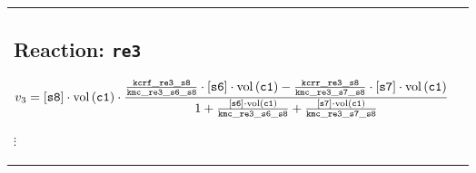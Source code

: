 \documentclass[12pt]{article}
\begin{document}
\begin{center}
\begin{tabular}{lc}
{\begin{minipage}[c]{18.9cm}
\subsection{Reaction: \texttt{re3}}

\begin{equation}
v_{3}=[\mathtt{s8}]\cdot \mathrm{vol}\left(\mathtt{c1}\right)\cdot
\frac{\frac{\mathtt{kcrf\-\_re3\-\_s8}}{\mathtt{kmc\-\_re3\-\_s6\-\_s8}}\cdot
[\mathtt{s6}]\cdot
\mathrm{vol}\left(\mathtt{c1}\right)-\frac{\mathtt{kcrr\-\_re3\-\_s8}}{\mathtt{
kmc\-\_re3\-\_s7\-\_s8}}\cdot [\mathtt{s7}]\cdot
\mathrm{vol}\left(\mathtt{c1}\right)}{1+\frac{[\mathtt{s6}]\cdot
\mathrm{vol}\left(\mathtt{c1}\right)}{\mathtt{kmc\-\_re3\-\_s6\-\_s8}}+\frac{[
\mathtt{s7}]\cdot
\mathrm{vol}\left(\mathtt{c1}\right)}{\mathtt{kmc\-\_re3\-\_s7\-\_s8}}}
\end{equation}
\begin{center}
$\vdots$
\end{center}
\end{minipage}}
\end{tabular}
\end{center}
\end{document}
